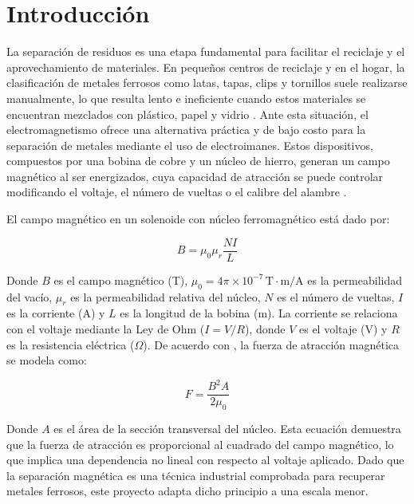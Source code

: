 \section{Introducción}

La separación de residuos es una etapa fundamental para facilitar el reciclaje y el aprovechamiento de materiales. En pequeños centros de reciclaje y en el hogar, la clasificación de metales ferrosos como latas, tapas, clips y tornillos suele realizarse manualmente, lo que resulta lento e ineficiente cuando estos materiales se encuentran mezclados con plástico, papel y vidrio \parencite{serway2018}. Ante esta situación, el electromagnetismo ofrece una alternativa práctica y de bajo costo para la separación de metales mediante el uso de electroimanes. Estos dispositivos, compuestos por una bobina de cobre y un núcleo de hierro, generan un campo magnético al ser energizados, cuya capacidad de atracción se puede controlar modificando el voltaje, el número de vueltas o el calibre del alambre \parencite{halliday2014}.

El campo magnético en un solenoide con núcleo ferromagnético está dado por:

\begin{equation}
  B = \mu_0 \mu_r \frac{N I}{L}
\end{equation}

Donde $B$ es el campo magnético (T), $\mu_0 = 4\pi \times 10^{-7} \, \text{T}\cdot\text{m/A}$ es la permeabilidad del vacío, $\mu_r$ es la permeabilidad relativa del núcleo, $N$ es el número de vueltas, $I$ es la corriente (A) y $L$ es la longitud de la bobina (m). La corriente se relaciona con el voltaje mediante la Ley de Ohm ($I = V/R$), donde $V$ es el voltaje (V) y $R$ es la resistencia eléctrica ($\Omega$). De acuerdo con \parencite{tipler2008}, la fuerza de atracción magnética se modela como:

\begin{equation}
  F = \frac{B^2 A}{2\mu_0}
\end{equation}

Donde $A$ es el área de la sección transversal del núcleo. Esta ecuación demuestra que la fuerza de atracción es proporcional al cuadrado del campo magnético, lo que implica una dependencia no lineal con respecto al voltaje aplicado. Dado que la separación magnética es una técnica industrial comprobada para recuperar metales ferrosos, este proyecto adapta dicho principio a una escala menor.

